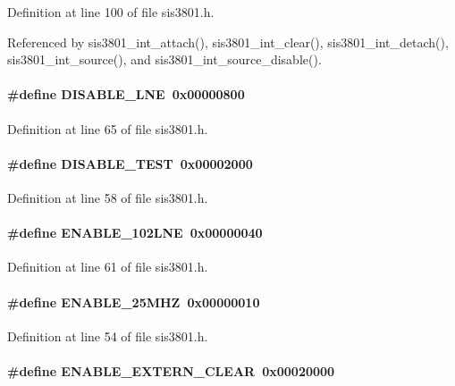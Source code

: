 Definition at line 100 of file sis3801.h.

Referenced by sis3801\_\-int\_\-attach(), sis3801\_\-int\_\-clear(), sis3801\_\-int\_\-detach(), sis3801\_\-int\_\-source(), and sis3801\_\-int\_\-source\_\-disable().
\paragraph[{DISABLE\_\-LNE}]{\setlength{\rightskip}{0pt plus 5cm}\#define DISABLE\_\-LNE~0x00000800}\hfill\label{sis3801_8h_ae2e9c6f6e53d82b4728a6fecf06ce851}


Definition at line 65 of file sis3801.h.
\paragraph[{DISABLE\_\-TEST}]{\setlength{\rightskip}{0pt plus 5cm}\#define DISABLE\_\-TEST~0x00002000}\hfill\label{sis3801_8h_a56718fb86690cb1c5f418427bbaa0a7f}


Definition at line 58 of file sis3801.h.
\paragraph[{ENABLE\_\-102LNE}]{\setlength{\rightskip}{0pt plus 5cm}\#define ENABLE\_\-102LNE~0x00000040}\hfill\label{sis3801_8h_ab2493c793dc7845cc57392ecb79dd6e5}


Definition at line 61 of file sis3801.h.
\paragraph[{ENABLE\_\-25MHZ}]{\setlength{\rightskip}{0pt plus 5cm}\#define ENABLE\_\-25MHZ~0x00000010}\hfill\label{sis3801_8h_a8dba09530af1bc7960326400b530ff59}


Definition at line 54 of file sis3801.h.
\paragraph[{ENABLE\_\-EXTERN\_\-CLEAR}]{\setlength{\rightskip}{0pt plus 5cm}\#define ENABLE\_\-EXTERN\_\-CLEAR~0x00020000}\hfill\label{sis3801_8h_a7544b0058a3750d2bef341f5cd88d14d}


